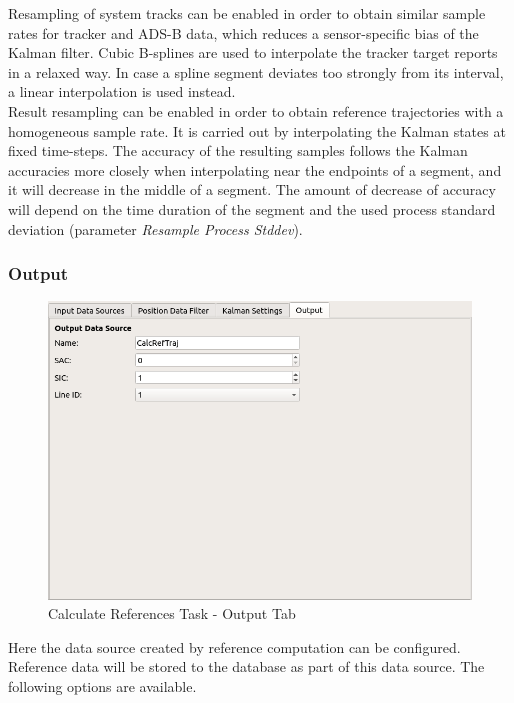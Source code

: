 Resampling of system tracks can be enabled in order to obtain similar sample rates for tracker and ADS-B
data, which reduces a sensor-specific bias of the Kalman filter. Cubic B-splines are used to interpolate the tracker target
reports in a relaxed way. In case a spline segment deviates too strongly from its interval, a linear interpolation is 
used instead. \\

Result resampling can be enabled in order to obtain reference trajectories with a homogeneous sample rate. 
It is carried out by interpolating the Kalman states at fixed time-steps. The accuracy of the resulting samples
follows the Kalman accuracies more closely when interpolating near the endpoints of a segment, and it will decrease
in the middle of a segment. The amount of decrease of accuracy will depend on the time duration of the segment and the used 
process standard deviation (parameter \textit{Resample Process Stddev}).

\subsubsection{Output}

\begin{figure}[H]
    \center
      \includegraphics[frame,width=14cm]{figures/ui_task_references_tab_info.png}
    \caption{Calculate References Task - Output Tab}
\end{figure}

Here the data source created by reference computation can be configured. 
Reference data will be stored to the database as part of this data source.
The following options are available. \\

